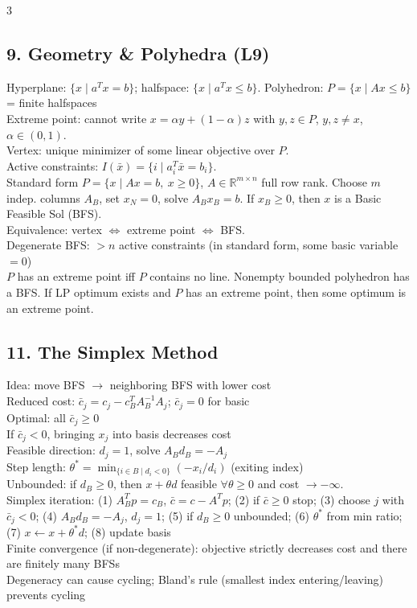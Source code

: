 \documentclass[8pt,landscape]{extarticle}
\newcommand{\R}{\mathbb{R}}
\newcommand{\1}{\mathbf{1}}
\newcommand{\0}{\mathbf{0}}
\begin{document}
\begin{multicols*}{3}
\subsection*{9. Geometry \& Polyhedra (L9)}
Hyperplane: $\{x\mid a^Tx=b\}$; halfspace: $\{x\mid a^Tx\le b\}$. 
Polyhedron: $P=\{x\mid Ax\le b\}$ = finite halfspaces \\
Extreme point: cannot write $x=\alpha y+(1-\alpha)z$ with $y,z\in P$, $y,z\ne x$, $\alpha\in(0,1)$. \\
Vertex: unique minimizer of some linear objective over $P$. \\
Active constraints: $I(\bar x)=\{i\mid a_i^T\bar x=b_i\}$. \\
Standard form $P=\{x\mid Ax=b,\ x\ge0\}$, $A\in\R^{m\times n}$ full row rank.
Choose $m$ indep. columns $A_B$, set $x_N=0$, solve $A_Bx_B=b$.
If $x_B\ge0$, then $x$ is a Basic Feasible Sol (BFS). \\
Equivalence: vertex $\iff$ extreme point $\iff$ BFS. \\
Degenerate BFS: $>n$ active constraints (in standard form, some basic variable $=0$) \\
$P$ has an extreme point iff $P$ contains no line. Nonempty bounded polyhedron has a BFS.
If LP optimum exists and $P$ has an extreme point, then some optimum is an extreme point.

\subsection*{11. The Simplex Method}
Idea: move BFS $\to$ neighboring BFS with lower cost \\
Reduced cost: $\bar c_j = c_j - c_B^T A_B^{-1}A_j$; $\bar c_j=0$ for basic \\
Optimal: all $\bar c_j \ge 0$ \\
If $\bar c_j<0$, bringing $x_j$ into basis decreases cost \\
Feasible direction: $d_j=1$, solve $A_B d_B = -A_j$ \\
Step length: $\theta^* = \min_{\{i\in B\mid d_i<0\}} (-x_i/d_i)$ (exiting index) \\
Unbounded: if $d_B\ge0$, then $x+\theta d$ feasible $\forall\theta\ge0$ and cost $\to-\infty$. \\
Simplex iteration: (1) $A_B^Tp=c_B$, $\bar c = c-A^Tp$; (2) if $\bar c\ge0$ stop; (3) choose $j$ with $\bar c_j<0$; (4) $A_B d_B=-A_j$, $d_j=1$; (5) if $d_B\ge0$ unbounded; (6) $\theta^*$ from min ratio; (7) $x\leftarrow x+\theta^*d$; (8) update basis \\
Finite convergence (if non-degenerate): objective strictly decreases cost and there are finitely many BFSs\\
Degeneracy can cause cycling; Bland's rule (smallest index entering/leaving) prevents cycling



\end{multicols*}
\end{document}
